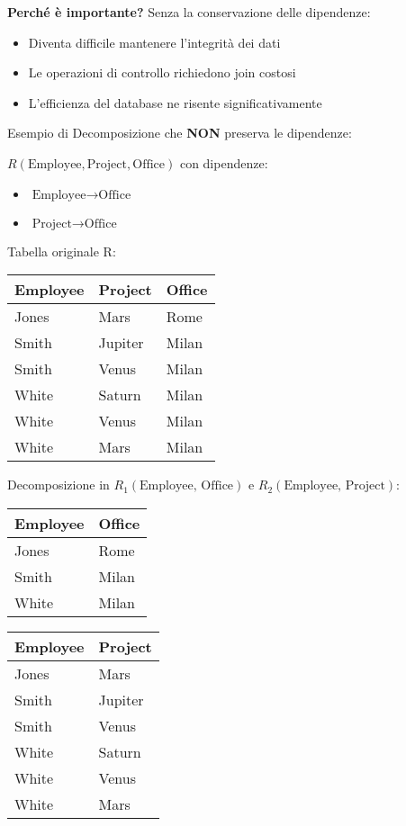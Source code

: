 \textbf{Perché è importante?} Senza la conservazione delle dipendenze:
\begin{itemize}
	\item Diventa difficile mantenere l'integrità dei dati
	\item Le operazioni di controllo richiedono join costosi
	\item L'efficienza del database ne risente significativamente
\end{itemize}

\noindent Esempio di Decomposizione che \textbf{NON} preserva le dipendenze:

$R(\text{Employee}, \text{Project}, \text{Office})$ con dipendenze:

\begin{itemize}
	\item $\text{Employee} \rightarrow \text{Office}$
	\item $\text{Project} \rightarrow \text{Office}$
\end{itemize}

\noindent Tabella originale R:
\begin{center}
\begin{tabular}{|l|l|l|}
	\hline
	\textbf{Employee} & \textbf{Project} & \textbf{Office} \\ \hline
	Jones & Mars & Rome \\ \hline
	Smith & Jupiter & Milan \\ \hline
	Smith & Venus & Milan \\ \hline
	White & Saturn & Milan \\ \hline
	White & Venus & Milan \\ \hline
	White & Mars & Milan \\ \hline
\end{tabular}
\end{center}

\noindent Decomposizione in $R_1(\text{Employee, Office})$ e $R_2(\text{Employee, Project})$:
\begin{center}
\begin{tabular}{|l|l|}
	\hline
	\textbf{Employee} & \textbf{Office} \\ \hline
	Jones & Rome \\ \hline
	Smith & Milan \\ \hline
	White & Milan \\ \hline
\end{tabular}
\quad
\begin{tabular}{|l|l|}
	\hline
	\textbf{Employee} & \textbf{Project} \\ \hline
	Jones & Mars \\ \hline
	Smith & Jupiter \\ \hline
	Smith & Venus \\ \hline
	White & Saturn \\ \hline
	White & Venus \\ \hline
	White & Mars \\ \hline
\end{tabular}
\end{center}

